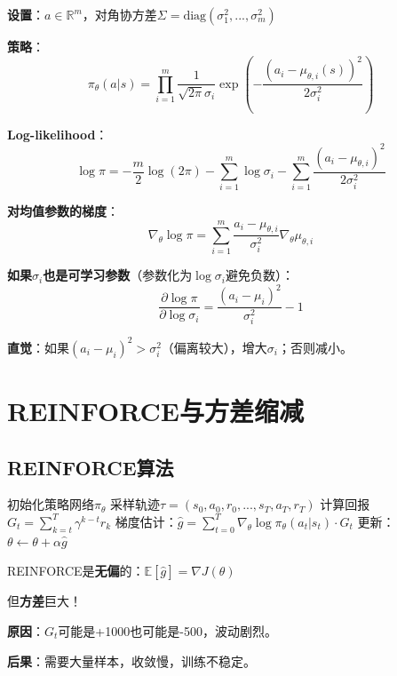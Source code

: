 \documentclass[11pt,a4paper]{article}
\theoremstyle{definition}
\begin{document}
\begin{calculation}
\textbf{设置}：$a \in \mathbb{R}^m$，对角协方差$\Sigma = \text{diag}(\sigma_1^2, ..., \sigma_m^2)$

\textbf{策略}：
\[
\pi_\theta(a|s) = \prod_{i=1}^m \frac{1}{\sqrt{2\pi}\sigma_i} \exp\left(-\frac{(a_i - \mu_{\theta,i}(s))^2}{2\sigma_i^2}\right)
\]

\textbf{Log-likelihood}：
\[
\log \pi = -\frac{m}{2}\log(2\pi) - \sum_{i=1}^m \log \sigma_i - \sum_{i=1}^m \frac{(a_i - \mu_{\theta,i})^2}{2\sigma_i^2}
\]

\textbf{对均值参数的梯度}：
\[
\nabla_\theta \log \pi = \sum_{i=1}^m \frac{a_i - \mu_{\theta,i}}{\sigma_i^2} \nabla_\theta \mu_{\theta,i}
\]

\textbf{如果$\sigma_i$也是可学习参数}（参数化为$\log \sigma_i$避免负数）：
\[
\frac{\partial \log \pi}{\partial \log \sigma_i} = \frac{(a_i - \mu_i)^2}{\sigma_i^2} - 1
\]

\textbf{直觉}：如果$(a_i - \mu_i)^2 > \sigma_i^2$（偏离较大），增大$\sigma_i$；否则减小。
\end{calculation}

\section{REINFORCE与方差缩减}

\subsection{REINFORCE算法}

\begin{algorithm}[H]
\caption{REINFORCE}
\begin{algorithmic}[1]
\State 初始化策略网络$\pi_\theta$
    \State 采样轨迹$\tau = (s_0, a_0, r_0, ..., s_T, a_T, r_T)$
    \State 计算回报$G_t = \sum_{k=t}^T \gamma^{k-t} r_k$
    \State 梯度估计：$\hat{g} = \sum_{t=0}^T \nabla_\theta \log \pi_\theta(a_t|s_t) \cdot G_t$
    \State 更新：$\theta \leftarrow \theta + \alpha \hat{g}$
\EndFor
\end{algorithmic}
\end{algorithm}

\begin{plainwords}[REINFORCE的问题]
REINFORCE是\textbf{无偏}的：$\mathbb{E}[\hat{g}] = \nabla J(\theta)$

但\textbf{方差}巨大！

\textbf{原因}：$G_t$可能是+1000也可能是-500，波动剧烈。

\textbf{后果}：需要大量样本，收敛慢，训练不稳定。
\end{plainwords}
\end{document}
